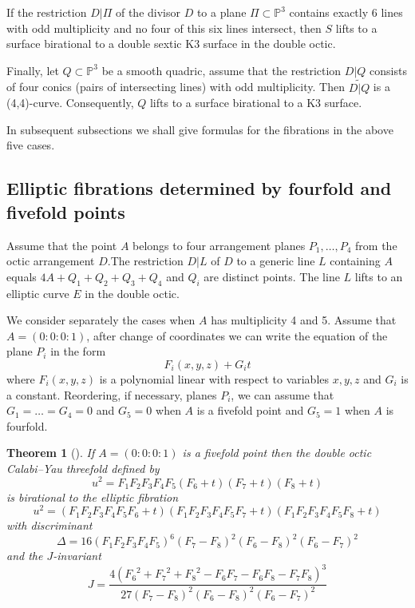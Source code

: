 \documentclass[12pt]{amsart}
\theoremstyle{plain}
\newtheorem{theorem}{Theorem}[section]
\theoremstyle{remark}
\theoremstyle{definition}
\newcommand{\PP}{\mathbb P}
\numberwithin{table}{section}
\begin{document}
If the restriction $D|\Pi$ of the divisor $D$ to a plane $\Pi\subset \PP^{3}$ contains exactly 6 lines with odd multiplicity and no four of this six lines intersect, then  $S$ lifts to a surface birational to a double sextic K3 surface in the double octic.

Finally, let $Q\subset \PP^{3}$ be a smooth quadric, assume that the restriction  $D|Q$ consists of four conics (pairs of intersecting lines)
with odd multiplicity. Then $\widetilde {D|Q}$ is a (4,4)-curve. Consequently, $Q$ lifts to a surface birational to a K3 surface.


In subsequent subsections we shall give formulas for the fibrations in the above five cases.

\subsection{Elliptic fibrations determined by fourfold and fivefold points}
Assume that the point $A$ belongs to four arrangement planes $P_{1},\dots,P_{4}$ from the octic arrangement $D$.The restriction $D|L$ of $D$ to a generic line $L$ containing $A$ equals $4A+Q_{1}+Q_{2}+Q_{3}+Q_{4}$ and  $Q_{i}$ are distinct points. The line $L$ lifts to an elliptic curve $E$ in the double octic.

We consider separately the cases when $A$ has multiplicity 4 and 5. Assume that $A=(0:0:0:1)$, after change of coordinates we can write the equation of the plane $P_{i}$ in the form
\[F_{i}(x,y,z)+G_{i}t\]
where $F_{i}(x,y,z)$ is a polynomial linear with respect to variables $x,y,z$ and $G_{i}$ is a constant. Reordering, if necessary, planes $P_{i}$, we can assume that $G_{1}=\dots=G_{4}=0$ and $G_{5}=0$ when $A$ is a fivefold point and $G_{5}=1$ when $A$ is fourfold.

\begin{theorem}[\mbox{\cite[Thm. 2.1]{CK-C2}}]\label{thm:ellfive}
	If $A=(0:0:0:1)$ is a fivefold point then
	the double octic Calabi--Yau threefold defined by
	\begin{equation}\label{docsing5}
		u^{2}=F_{1}F_{2}F_{3}F_{4}F_{5}
		(F_{6}+t)(F_{7}+t)(F_{8}+t)
	\end{equation}
	is birational to the elliptic fibration
	\[u^{2} = \left(F_{1}F_{2}F_{3}F_{4}F_{5} F_{6}   +t \right) \left(F_{1}F_{2}F_{3}F_{4}F_{5} F_{7}  +t \right) \left(F_{1}F_{2}F_{3}F_{4}F_{5}F_{8}  +t \right)
	\]
	with discriminant
	\[
	\Delta = 16 (F_{1}F_{2}F_{3}F_{4}F_{5})^{6} \left({F_{7}}  -{F_{8}}  \right)^{2}
	\left({F_{6}}  -{F_{8}}  \right)^{2} \left({F_{6}} -{F_{7}} \right)^{2}\]
	and the $J$-invariant
	\[J= \frac{4 \left(
		{F_{6}}^{2} + {F_{7}}^{2}  + {F_{8}}^{2}
		-{F_{6}} F_{7}
		-{F_{6}} F_{8}
		-{F_{7}} F_{8}
		\right)^{3}}
	{27 {\left({F_{7}}  -{F_{8}} \right)^{2} \left({F_{6}} -{F_{8}} \right)^{2} \left({F_{6}}  -{F_{7}} \right)^{2}}}
	\]
\end{theorem}
\end{document}
